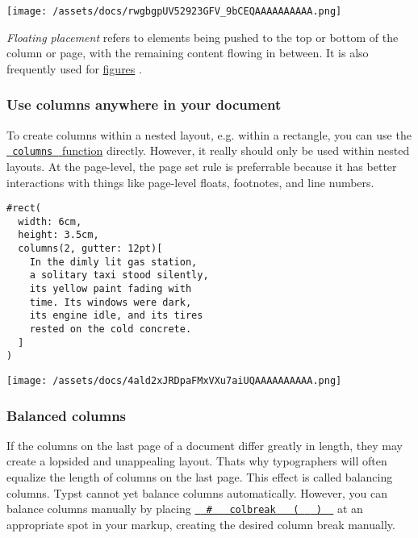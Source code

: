 \texttt{[image: /assets/docs/rwgbgpUV52923GFV\_9bCEQAAAAAAAAAA.png]}

\emph{Floating placement} refers to elements being pushed to the top or
bottom of the column or page, with the remaining content flowing in
between. It is also frequently used for
\href{/docs/reference/model/figure/\#parameters-placement}{figures} .

\subsubsection{Use columns anywhere in your
document}\label{columns-anywhere}

To create columns within a nested layout, e.g. within a rectangle, you
can use the \href{/docs/reference/layout/columns/}{\texttt{\ columns\ }
function} directly. However, it really should only be used within nested
layouts. At the page-level, the page set rule is preferrable because it
has better interactions with things like page-level floats, footnotes,
and line numbers.

\begin{verbatim}
#rect(
  width: 6cm,
  height: 3.5cm,
  columns(2, gutter: 12pt)[
    In the dimly lit gas station,
    a solitary taxi stood silently,
    its yellow paint fading with
    time. Its windows were dark,
    its engine idle, and its tires
    rested on the cold concrete.
  ]
)
\end{verbatim}

\texttt{[image: /assets/docs/4ald2xJRDpaFMxVXu7aiUQAAAAAAAAAA.png]}

\subsubsection{Balanced columns}\label{balanced-columns}

If the columns on the last page of a document differ greatly in length,
they may create a lopsided and unappealing layout.
That\textquotesingle s why typographers will often equalize the length
of columns on the last page. This effect is called balancing columns.
Typst cannot yet balance columns automatically. However, you can balance
columns manually by placing
\href{/docs/reference/layout/colbreak/}{\texttt{\ }{\texttt{\ \#\ }}\texttt{\ }{\texttt{\ colbreak\ }}\texttt{\ }{\texttt{\ (\ }}\texttt{\ }{\texttt{\ )\ }}\texttt{\ }}
at an appropriate spot in your markup, creating the desired column break
manually.

